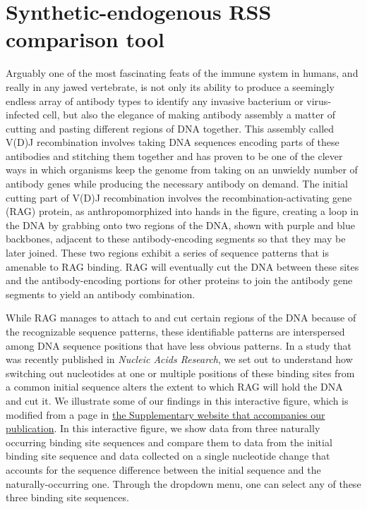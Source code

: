 \documentclass[11pt, oneside]{article}   	%
\begin{document}
\section*{Synthetic-endogenous RSS comparison tool}
\author{Griffin Chure, Soichi Hirokawa}

Arguably one of the most fascinating feats of the immune system in humans, and really in any jawed vertebrate, is not only
its ability to produce a seemingly endless array of antibody types to identify any invasive bacterium or virus-infected cell,
but also the elegance of making antibody assembly a matter of cutting and pasting different regions of DNA together. This
assembly called V(D)J recombination involves taking DNA sequences encoding parts of these antibodies and stitching them
together and has proven to be one of the clever ways in which organisms keep the genome from taking on an unwieldy 
number of antibody genes while producing the necessary antibody on demand. The initial cutting part of V(D)J recombination 
involves the recombination-activating gene (RAG) protein, as anthropomorphized into hands in the figure, creating a loop 
in the DNA by grabbing onto two regions of the DNA, shown with purple and blue backbones, adjacent to these 
antibody-encoding segments so that they may be later joined. These two regions exhibit a series of sequence patterns 
that is amenable to RAG binding. RAG will eventually cut the DNA between these sites and the antibody-encoding portions
for other proteins to join the antibody gene segments to yield an antibody combination.

While RAG manages to attach to and cut certain regions of the DNA because of the recognizable sequence patterns, these
identifiable patterns are interspersed among DNA sequence positions that have less obvious patterns. In a study that was 
recently published in \emph{Nucleic Acids Research}, we set out to understand how switching out nucleotides at one or
multiple positions of these binding sites from a common initial sequence alters the extent to which RAG will hold the 
DNA and cut it. We illustrate some of our findings in this interactive figure, which is modified from a page in 
\href{https://www.rpgroup.caltech.edu/vdj_recombination}{the Supplementary website that accompanies our publication}. 
In this interactive figure, we show data from three naturally occurring binding site sequences and compare them to
data from the initial binding site sequence and data collected on a single nucleotide change that accounts for the sequence
difference between the initial sequence and the naturally-occurring one. Through the dropdown menu, one can select
any of these three binding site sequences. 
\end{document}
